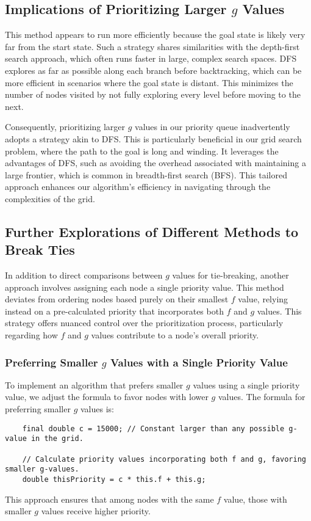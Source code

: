 \documentclass{article}
\begin{document}
\subsection{Implications of Prioritizing Larger $g$ Values}
This method appears to run more efficiently because the goal state is likely very far from the start state. Such a strategy shares similarities with the depth-first search approach, which often runs faster in large, complex search spaces. DFS explores as far as possible along each branch before backtracking, which can be more efficient in scenarios where the goal state is distant. This minimizes the number of nodes visited by not fully exploring every level before moving to the next.

Consequently, prioritizing larger $g$ values in our priority queue inadvertently adopts a strategy akin to DFS. This is particularly beneficial in our grid search problem, where the path to the goal is long and winding. It leverages the advantages of DFS, such as avoiding the overhead associated with maintaining a large frontier, which is common in breadth-first search (BFS). This tailored approach enhances our algorithm's efficiency in navigating through the complexities of the grid.

\subsection{Further Explorations of Different Methods to Break Ties}
In addition to direct comparisons between \(g\) values for tie-breaking, another approach involves assigning each node a single priority value. This method deviates from ordering nodes based purely on their smallest \(f\) value, relying instead on a pre-calculated priority that incorporates both \(f\) and \(g\) values. This strategy offers nuanced control over the prioritization process, particularly regarding how \(f\) and \(g\) values contribute to a node's overall priority.

\subsubsection{Preferring Smaller \(g\) Values with a Single Priority Value}
To implement an algorithm that prefers smaller \(g\) values using a single priority value, we adjust the formula to favor nodes with lower \(g\) values. The formula for preferring smaller \(g\) values is:
\begin{verbatim}
    final double c = 15000; // Constant larger than any possible g-value in the grid.
    
    // Calculate priority values incorporating both f and g, favoring smaller g-values.
    double thisPriority = c * this.f + this.g;
\end{verbatim}
This approach ensures that among nodes with the same \(f\) value, those with smaller \(g\) values receive higher priority.
\end{document}
